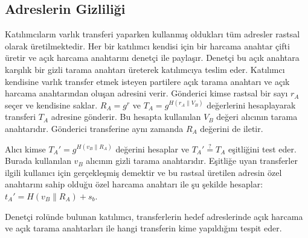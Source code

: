 \documentclass[a4paper,11pt]{article}
\begin{document}
\subsection{Adreslerin Gizliliği}
 
Katılımcıların varlık transferi yaparken kullanmış oldukları tüm adresler rastsal olarak üretilmektedir. Her bir katılımcı kendisi için bir harcama anahtar çifti üretir ve açık harcama anahtarını denetçi ile paylaşır. Denetçi bu açık anahtara karşılık bir gizli tarama anahtarı üreterek katılımcıya teslim eder. Katılımcı kendisine varlık transfer etmek isteyen partilere açık tarama anahtarı ve açık harcama anahtarından oluşan adresini verir. Gönderici kimse rastsal bir sayı $r_{A}$ seçer ve kendisine saklar. $R_{A}=g^{r}$ ve $T_{A}=g^{H(r_{A} \| V_{B})}$ değerlerini hesaplayarak transferi $T_{A}$ adresine gönderir. Bu hesapta kullanılan $V_{B}$ değeri alıcının tarama anahtarıdır. Gönderici transferine aynı zamanda $R_{A}$ değerini de iletir.

Alıcı kimse $T_{A}'=g^{H(v_{B} \| R_{A})}$ değerini hesaplar ve $T_{A}'\stackrel{?}{=}T_{A}$ eşitliğini test eder. Burada kullanılan $v_{B}$ alıcının gizli tarama anahtarıdır. Eşitliğe uyan transferler ilgili kullanıcı için gerçekleşmiş demektir ve bu rastsal üretilen adresin özel anahtarını sahip olduğu özel harcama anahtarı ile şu şekilde hesaplar: $t_{A}'=H(v_{B} \| R_{A})+s_{b}$.

Denetçi rolünde bulunan katılımcı, transferlerin hedef adreslerinde açık harcama ve açık tarama anahtarları ile hangi transferin kime yapıldığını tespit eder.
\end{document}
